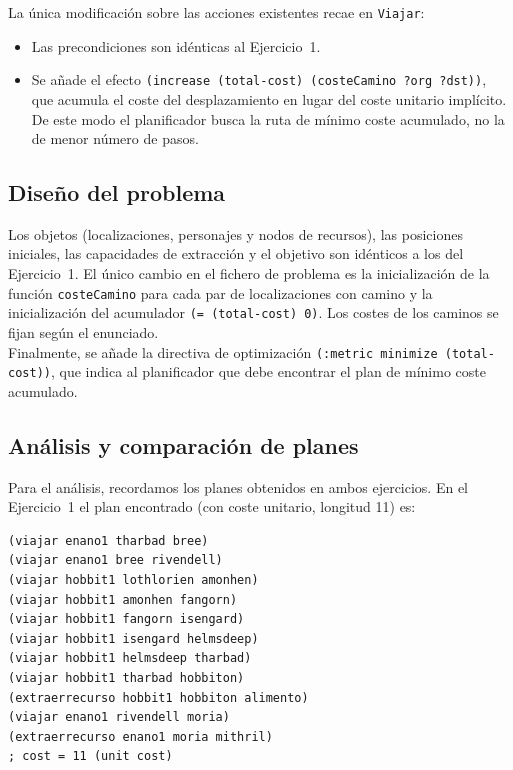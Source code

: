 \documentclass[10pt]{article}
\begin{document}
La única modificación sobre las acciones existentes recae en \texttt{Viajar}:
\begin{itemize}[label=-]
    \item Las precondiciones son idénticas al Ejercicio~1.
    \item Se añade el efecto \texttt{(increase (total-cost) (costeCamino ?org ?dst))}, que acumula el coste del desplazamiento en lugar del coste unitario implícito. De este modo el planificador busca la ruta de mínimo coste acumulado, no la de menor número de pasos.
\end{itemize}
 
\subsection{Diseño del problema}
 
Los objetos (localizaciones, personajes y nodos de recursos), las posiciones iniciales, las capacidades de extracción y el objetivo son idénticos a los del Ejercicio~1. El único cambio en el fichero de problema es la inicialización de la función \texttt{costeCamino} para cada par de localizaciones con camino y la inicialización del acumulador \texttt{(= (total-cost) 0)}. Los costes de los caminos se fijan según el enunciado.\\
 
Finalmente, se añade la directiva de optimización \texttt{(:metric minimize (total-cost))}, que indica al planificador que debe encontrar el plan de mínimo coste acumulado.
 
\subsection{Análisis y comparación de planes}
 
Para el análisis, recordamos los planes obtenidos en ambos ejercicios. En el Ejercicio~1 el plan encontrado (con coste unitario, longitud 11) es:
 
\begin{lstlisting}
(viajar enano1 tharbad bree)
(viajar enano1 bree rivendell)
(viajar hobbit1 lothlorien amonhen)
(viajar hobbit1 amonhen fangorn)
(viajar hobbit1 fangorn isengard)
(viajar hobbit1 isengard helmsdeep)
(viajar hobbit1 helmsdeep tharbad)
(viajar hobbit1 tharbad hobbiton)
(extraerrecurso hobbit1 hobbiton alimento)
(viajar enano1 rivendell moria)
(extraerrecurso enano1 moria mithril)
; cost = 11 (unit cost)
\end{lstlisting}
 
\end{document}
